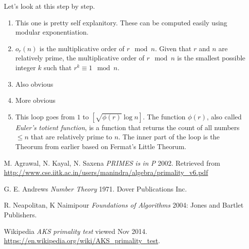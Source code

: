 \documentclass[11pt]{article}
\begin{document}
Let's look at this step by step.
\begin{enumerate}
  \item This one is pretty self explanitory. These can be computed easily using modular exponentiation.
  \item $o_r(n)$ is the multiplicative order of $r \mod n$. Given that $r$ and $n$ are relatively prime, the multiplicative order of $r \mod n$ is the smallest possible integer $k$ such that $r^k \equiv 1\mod n$.
  \item Also obvious
  \item More obvious
  \item This loop goes from $1$ to $[\sqrt{\phi(r)}\log{n}]$. The function $\phi(r)$, also called \emph{Euler's totient function}, is a function that returns the count of all numbers $\le n$ that are relatively prime to $n$. The inner part of the loop is the Theorum from earlier based on Fermat's Little Theorum. 
\end{enumerate}
\begin{thebibliography}{1}

   M. Agrawal, N. Kayal, N. Saxena {\em PRIMES is in P}  2002. Retrieved from \url{http://www.cse.iitk.ac.in/users/manindra/algebra/primality_v6.pdf}
  
   G. E. Andrews {\em Number Theory} 1971. Dover Publications Inc.

   R. Neapolitan, K Naimipour {\em Foundations of Algorithms } 2004: Jones and Bartlet Publishers.

   Wikipedia {\em AKS primality test} viewed Nov 2014. \url{https://en.wikipedia.org/wiki/AKS_primality_test}.

\end{thebibliography}
\end{document}
